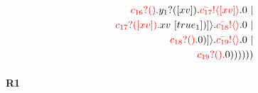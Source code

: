 \documentclass{article}
\begin{document}
\begin{align*}
\\ \color{red}c_{16}?().\color{black}\color{black}y_{1}?([xv]).\color{black}\color{red}\bar{c_{17}}! \langle [xv] \rangle \color{black}.0  \ | \\ \color{red}c_{17}?([xv]).\color{black}xv \ [true_{1}])] \rangle \color{black}.\color{red}\bar{c_{18}}! \langle  \rangle \color{black}.0  \ | \\ \color{red}c_{18}?().\color{black}0 )] \rangle \color{black}.\color{red}\bar{c_{19}}! \langle  \rangle \color{black}.0  \ | \\ \color{red}c_{19}?().\color{black}0 ))))))
\end{align*}
\paragraph{R1}
\begin{align*}

\end{align*}
\end{document}
